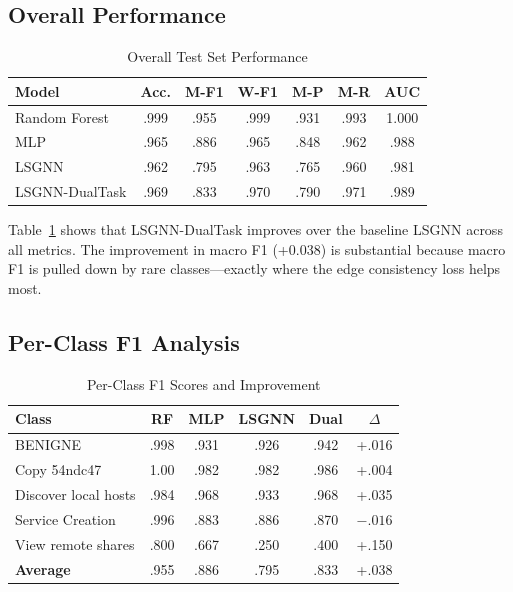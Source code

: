 \documentclass[conference]{IEEEtran}
\begin{document}
\subsection{Overall Performance}

\begin{table}[t]
\centering
\caption{Overall Test Set Performance}
\label{tab:main_results}
\begin{tabular}{@{}lcccccc@{}}
\toprule
\textbf{Model} & \textbf{Acc.} & \textbf{M-F1} & \textbf{W-F1} & \textbf{M-P} & \textbf{M-R} & \textbf{AUC} \\
\midrule
Random Forest  & .999 & .955 & .999 & .931 & .993 & 1.000 \\
MLP            & .965 & .886 & .965 & .848 & .962 & .988 \\
LSGNN          & .962 & .795 & .963 & .765 & .960 & .981 \\
LSGNN-DualTask & .969 & .833 & .970 & .790 & .971 & .989 \\
\bottomrule
\end{tabular}
\end{table}

Table~\ref{tab:main_results} shows that LSGNN-DualTask improves over the baseline LSGNN across all metrics. The improvement in macro F1 (+0.038) is substantial because macro F1 is pulled down by rare classes---exactly where the edge consistency loss helps most.

\subsection{Per-Class F1 Analysis}

\begin{table}[t]
\centering
\caption{Per-Class F1 Scores and Improvement}
\label{tab:perclass_detailed}
\begin{tabular}{@{}lccccc@{}}
\toprule
\textbf{Class} & \textbf{RF} & \textbf{MLP} & \textbf{LSGNN} & \textbf{Dual} & \textbf{$\Delta$} \\
\midrule
BENIGNE              & .998 & .931 & .926 & .942 & +.016 \\
Copy 54ndc47         & 1.00 & .982 & .982 & .986 & +.004 \\
Discover local hosts & .984 & .968 & .933 & .968 & +.035 \\
Service Creation     & .996 & .883 & .886 & .870 & $-.016$ \\
View remote shares   & .800 & .667 & .250 & .400 & +.150 \\
\midrule
\textbf{Average}     & .955 & .886 & .795 & .833 & +.038 \\
\bottomrule
\end{tabular}
\end{table}
\end{document}
